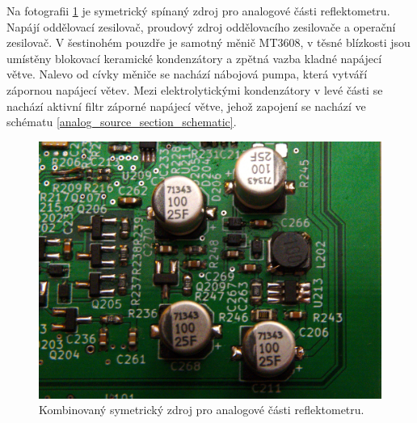 Na fotografii \ref{pcb_analog_supply} je symetrický spínaný zdroj pro analogové části reflektometru. Napájí oddělovací zesilovač, proudový zdroj oddělovacího zesilovače a operační zesilovač. V šestinohém pouzdře je samotný měnič MT3608, v těsné blízkosti jsou umístěny blokovací keramické kondenzátory a zpětná vazba kladné napájecí větve. Nalevo od cívky měniče se nachází nábojová pumpa, která vytváří zápornou napájecí větev. Mezi elektrolytickými kondenzátory v levé části se nachází aktivní filtr záporné napájecí větve, jehož zapojení se nachází ve schématu \ref{analog_source_section_schematic}.
\begin{figure}[htbp]
\includegraphics[width=\textwidth,keepaspectratio]{images/pcb/pcb_analog_supply.jpg}\caption{Kombinovaný symetrický zdroj pro analogové části reflektometru.}\label{pcb_analog_supply}
\end{figure}